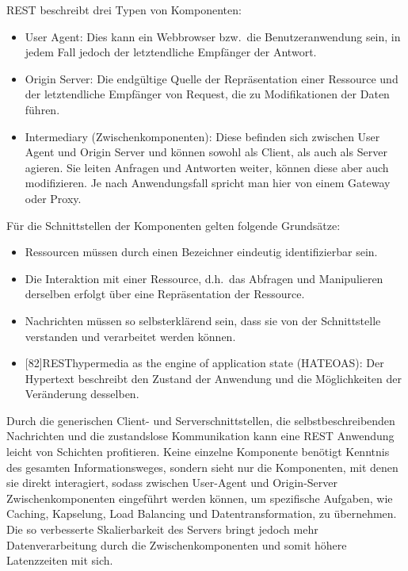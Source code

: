 REST beschreibt drei Typen von Komponenten:\cite[vgl.][96]{REST}
\begin{itemize}
  \item User Agent:
  Dies kann ein Webbrowser bzw.\ die Benutzeranwendung sein, in jedem Fall jedoch der letztendliche Empfänger der Antwort.
  \item Origin Server:
  Die endgültige Quelle der Repräsentation einer Ressource und der letztendliche Empfänger von Request, die zu Modifikationen der Daten führen.
  \item Intermediary (Zwischenkomponenten):
  Diese befinden sich zwischen User Agent und Origin Server und können sowohl als Client, als auch als Server agieren. Sie leiten Anfragen und Antworten weiter, können diese aber auch modifizieren. Je nach Anwendungsfall spricht man hier von einem Gateway oder Proxy.
\end{itemize}
Für die Schnittstellen der Komponenten gelten folgende Grundsätze:\cite[vgl.][82]{REST}
\begin{itemize}
  \item Ressourcen müssen durch einen Bezeichner eindeutig identifizierbar sein.
  \item Die Interaktion mit einer Ressource, d.h.\ das Abfragen und Manipulieren derselben erfolgt über eine Repräsentation der Ressource.
  \item Nachrichten müssen so selbsterklärend sein, dass sie von der Schnittstelle verstanden und verarbeitet werden können.
  \item {}[82]{REST}{hypermedia as the engine of application state} (HATEOAS): Der Hypertext beschreibt den Zustand der Anwendung und die Möglichkeiten der Veränderung desselben.
\end{itemize}
\par
Durch die generischen Client- und Serverschnittstellen, die selbstbeschreibenden Nachrichten und die zustandslose Kommunikation kann eine REST Anwendung leicht von Schichten profitieren.
Keine einzelne Komponente benötigt Kenntnis des gesamten Informationsweges, sondern sieht nur die Komponenten, mit denen sie direkt interagiert, sodass zwischen
User-Agent und Origin-Server Zwischenkomponenten eingeführt werden können, um spezifische Aufgaben, wie Caching, Kapselung, Load Balancing und Datentransformation, zu übernehmen.\cite[vgl.][99]{REST}
Die so verbesserte Skalierbarkeit des Servers bringt jedoch mehr Datenverarbeitung durch die Zwischenkomponenten und somit höhere Latenzzeiten mit sich.\cite[vgl.][83,98]{REST}

